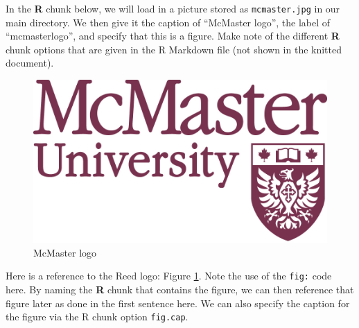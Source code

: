 \documentclass[12pt,twoside]{Mactemplate}
\theoremstyle{definition}
\theoremstyle{definition}
\theoremstyle{definition}
\theoremstyle{remark}
\begin{document}
In the \textbf{R} chunk below, we will load in a picture stored as
\texttt{mcmaster.jpg} in our main directory. We then give it the caption
of ``McMaster logo'', the label of ``mcmasterlogo'', and specify that
this is a figure. Make note of the different \textbf{R} chunk options
that are given in the R Markdown file (not shown in the knitted
document).
\begin{Shaded}
\begin{Highlighting}[]
\NormalTok{(} \NormalTok{)}
\end{Highlighting}
\end{Shaded}
\begin{figure}

{\centering \includegraphics[width=0.5\linewidth]{figure/mcmaster} 

}

\caption{McMaster logo}\label{fig:mcmasterlogo}
\end{figure}
Here is a reference to the Reed logo: Figure \ref{fig:mcmasterlogo}.
Note the use of the \texttt{fig:} code here. By naming the \textbf{R}
chunk that contains the figure, we can then reference that figure later
as done in the first sentence here. We can also specify the caption for
the figure via the R chunk option \texttt{fig.cap}.

\clearpage 
\end{document}
